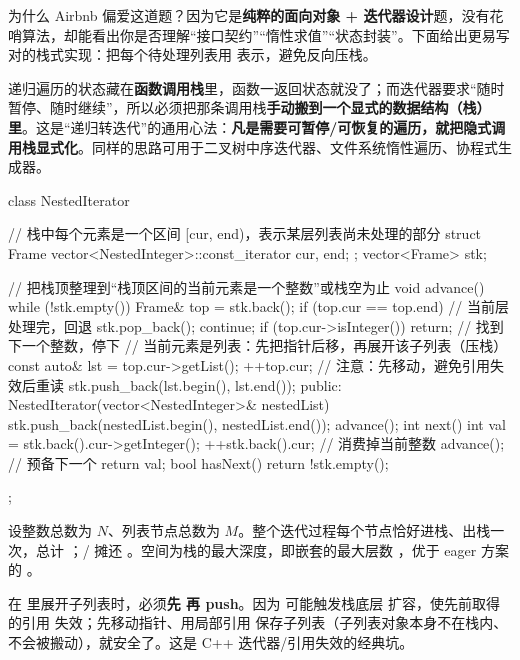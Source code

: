 为什么 Airbnb 偏爱这道题？因为它是\textbf{纯粹的面向对象 + 迭代器设计}题，没有花哨算法，却能看出你是否理解“接口契约”“惰性求值”“状态封装”。下面给出更易写对的栈式实现：把每个待处理列表用  表示，避免反向压栈。

\begin{idea}[迭代器 = 把“遍历状态”显式存进对象]
递归遍历的状态藏在\textbf{函数调用栈}里，函数一返回状态就没了；而迭代器要求“随时暂停、随时继续”，所以必须把那条调用栈\textbf{手动搬到一个显式的数据结构（栈）里}。这是“递归转迭代”的通用心法：\textbf{凡是需要可暂停/可恢复的遍历，就把隐式调用栈显式化}。同样的思路可用于二叉树中序迭代器、文件系统惰性遍历、协程式生成器。
\end{idea}

\begin{cpp}
class NestedIterator {
    // 栈中每个元素是一个区间 [cur, end)，表示某层列表尚未处理的部分
    struct Frame {
        vector<NestedInteger>::const_iterator cur, end;
    };
    vector<Frame> stk;

    // 把栈顶整理到“栈顶区间的当前元素是一个整数”或栈空为止
    void advance() {
        while (!stk.empty()) {
            Frame& top = stk.back();
            if (top.cur == top.end) {       // 当前层处理完，回退
                stk.pop_back();
                continue;
            }
            if (top.cur->isInteger()) return; // 找到下一个整数，停下
            // 当前元素是列表：先把指针后移，再展开该子列表（压栈）
            const auto& lst = top.cur->getList();
            ++top.cur;                       // 注意：先移动，避免引用失效后重读
            stk.push_back({lst.begin(), lst.end()});
        }
    }
public:
    NestedIterator(vector<NestedInteger>& nestedList) {
        stk.push_back({nestedList.begin(), nestedList.end()});
        advance();
    }
    int next() {
        int val = stk.back().cur->getInteger();
        ++stk.back().cur;   // 消费掉当前整数
        advance();          // 预备下一个
        return val;
    }
    bool hasNext() {
        return !stk.empty();
    }
};
\end{cpp}

\begin{keypoint}[复杂度]
设整数总数为 $N$、列表节点总数为 $M$。整个迭代过程每个节点恰好进栈、出栈一次，总计 ；/ 摊还 。空间为栈的最大深度，即嵌套的最大层数 ，优于 eager 方案的 。
\end{keypoint}

\begin{pitfall}[引用失效与展开顺序]
在  里展开子列表时，必须\textbf{先  再 push}。因为  可能触发栈底层  扩容，使先前取得的引用  失效；先移动指针、用局部引用  保存子列表（子列表对象本身不在栈内、不会被搬动），就安全了。这是 C++ 迭代器/引用失效的经典坑。
\end{pitfall}

